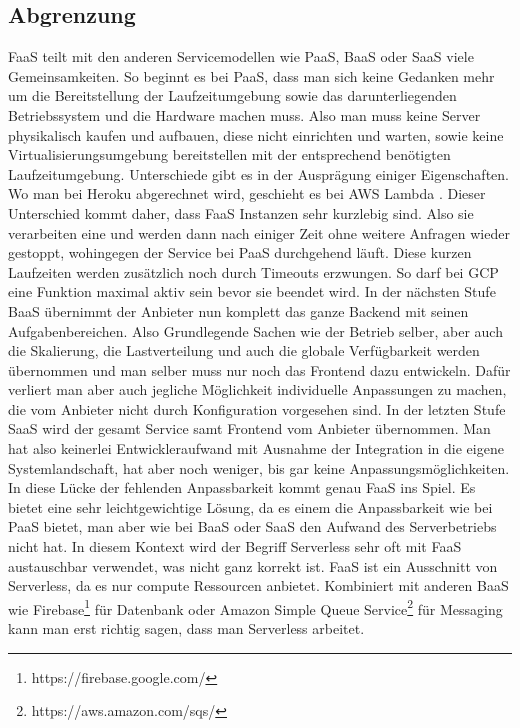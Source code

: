 \documentclass[12pt, a4paper]{article}
\begin{document}
\subsection{Abgrenzung}
\ac{FaaS} teilt mit den anderen Servicemodellen wie \ac{PaaS}, \ac{BaaS} oder \ac{SaaS} viele Gemeinsamkeiten.
So beginnt es bei \ac{PaaS}, dass man sich keine Gedanken mehr um die Bereitstellung der Laufzeitumgebung sowie das darunterliegenden Betriebssystem und die Hardware machen muss.
Also man muss keine Server physikalisch kaufen und aufbauen, diese nicht einrichten und warten, sowie keine Virtualisierungsumgebung bereitstellen mit der entsprechend benötigten Laufzeitumgebung.
Unterschiede gibt es in der Ausprägung einiger Eigenschaften.
Wo man bei Heroku \cite[pro Monat]{heroku_pricing} abgerechnet wird, geschieht es bei AWS Lambda \cite[pro Millisekunde]{aws_lambda_pricing}.
Dieser Unterschied kommt daher, dass \ac{FaaS} Instanzen sehr kurzlebig sind.
Also sie verarbeiten eine \cite[einzige Anfrage]{aws_lambda_scaling} und werden dann nach einiger Zeit ohne weitere Anfragen wieder gestoppt, wohingegen der Service bei \ac{PaaS} durchgehend läuft.
Diese kurzen Laufzeiten werden zusätzlich noch durch Timeouts erzwungen.
So darf bei \ac{GCP} eine Funktion maximal \cite[9 Minuten]{gcp_timeout} aktiv sein bevor sie beendet wird.
\newline
In der nächsten Stufe \ac{BaaS} übernimmt der Anbieter nun komplett das ganze Backend mit seinen Aufgabenbereichen.
Also Grundlegende Sachen wie der Betrieb selber, aber auch die Skalierung, die Lastverteilung und auch die globale Verfügbarkeit werden übernommen und man selber muss nur noch das Frontend dazu entwickeln.
Dafür verliert man aber auch jegliche Möglichkeit individuelle Anpassungen zu machen, die vom Anbieter nicht durch Konfiguration vorgesehen sind.
\newline
In der letzten Stufe \ac{SaaS} wird der gesamt Service samt Frontend vom Anbieter übernommen.
Man hat also keinerlei Entwickleraufwand mit Ausnahme der Integration in die eigene Systemlandschaft, hat aber noch weniger, bis gar keine Anpassungsmöglichkeiten.
\newline
In diese Lücke der fehlenden Anpassbarkeit kommt genau \ac{FaaS} ins Spiel.
Es bietet eine sehr leichtgewichtige Lösung, da es einem die Anpassbarkeit wie bei \ac{PaaS} bietet, man aber wie bei \ac{BaaS} oder \ac{SaaS} den Aufwand des Serverbetriebs nicht hat.
\newline
In diesem Kontext wird der Begriff Serverless sehr oft mit \ac{FaaS} austauschbar verwendet, was nicht ganz korrekt ist.
\ac{FaaS} ist ein Ausschnitt von Serverless, da es nur compute Ressourcen anbietet.
Kombiniert mit anderen \ac{BaaS} wie Firebase\footnote{https://firebase.google.com/} für Datenbank oder Amazon Simple Queue Service\footnote{https://aws.amazon.com/sqs/} für Messaging kann man erst richtig sagen, dass man Serverless arbeitet.
\end{document}
